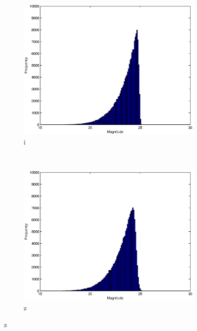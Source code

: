 \documentclass[useAMS,usenatbib,fleqn]{mn2e}
\begin{document}
\begin{figure}
\begin{subfigure}[b]{0.15\textwidth}
                \includegraphics[width=\columnwidth]{figures/i.eps}
                \caption{i}
        \end{subfigure}
         ~
        \begin{subfigure}[b]{0.15\textwidth}
                \includegraphics[width=\columnwidth]{figures/z.eps}
                \caption{z}
        \end{subfigure}
        

\end{figure}
\end{document}
